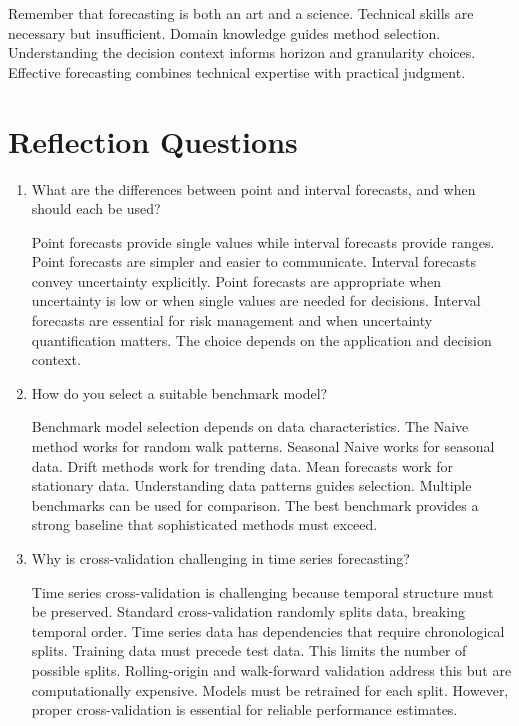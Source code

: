Remember that forecasting is both an art and a science. Technical skills are necessary but insufficient. Domain knowledge guides method selection. Understanding the decision context informs horizon and granularity choices. Effective forecasting combines technical expertise with practical judgment.

\section*{Reflection Questions}

\begin{enumerate}
\item What are the differences between point and interval forecasts, and when should each be used?

Point forecasts provide single values while interval forecasts provide ranges. Point forecasts are simpler and easier to communicate. Interval forecasts convey uncertainty explicitly. Point forecasts are appropriate when uncertainty is low or when single values are needed for decisions. Interval forecasts are essential for risk management and when uncertainty quantification matters. The choice depends on the application and decision context.

\item How do you select a suitable benchmark model?

Benchmark model selection depends on data characteristics. The Naive method works for random walk patterns. Seasonal Naive works for seasonal data. Drift methods work for trending data. Mean forecasts work for stationary data. Understanding data patterns guides selection. Multiple benchmarks can be used for comparison. The best benchmark provides a strong baseline that sophisticated methods must exceed.

\item Why is cross-validation challenging in time series forecasting?

Time series cross-validation is challenging because temporal structure must be preserved. Standard cross-validation randomly splits data, breaking temporal order. Time series data has dependencies that require chronological splits. Training data must precede test data. This limits the number of possible splits. Rolling-origin and walk-forward validation address this but are computationally expensive. Models must be retrained for each split. However, proper cross-validation is essential for reliable performance estimates.
\end{enumerate}


